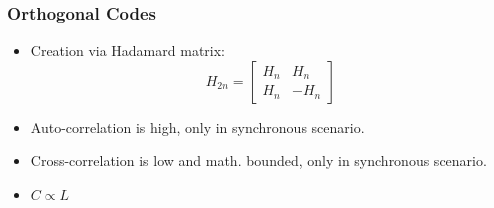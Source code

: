 \documentclass{beamer}
\begin{document}
	\begin{frame}\frametitle{Orthogonal Codes}
		\begin{itemize}

			\item Creation via Hadamard matrix: 
			\begin{equation*}
				H_{2n} = 
				\begin{bmatrix} 
					H_n & H_n \\ 
					H_n & -H_n 
				\end{bmatrix}
			\end{equation*}

			\item Auto-correlation is high, only in synchronous scenario.

			\item Cross-correlation is low and math. bounded, only in synchronous scenario.

			\item $C \propto L$


		\end{itemize}
		

	\end{frame}
\end{document}
